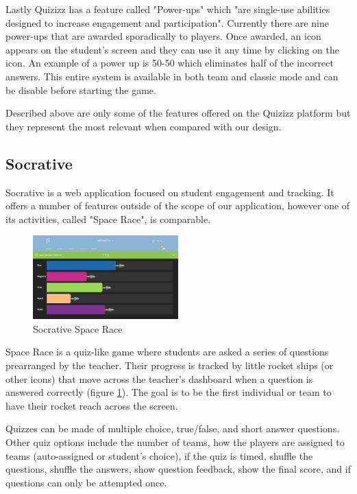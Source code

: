 \documentclass{article}
\begin{document}
Lastly Quizizz has a feature called "Power-ups" which "are single-use abilities designed to increase engagement and participation"\cite{quizizz}. Currently there are nine power-ups that are awarded sporadically to players. Once awarded, an icon appears on the student's screen and they can use it any time by clicking on the icon. An example of a power up is 50-50 which eliminates half of the incorrect answers. This entire system is available in both team and classic mode and can be disable before starting the game.

Described above are only some of the features offered on the Quizizz platform but they represent the most relevant when compared with our design.

\subsection{Socrative}
Socrative is a web application focused on student engagement and tracking. It offers a number of features outside of the scope of our application, however one of its activities, called "Space Race", is comparable.
\begin{figure}
    \centering
    \includegraphics[width=0.5\textwidth]{images/socrative-space_race.jpg}
    \caption{Socrative Space Race \cite{socrative}}
    \label{fig:socrative-space-race}
\end{figure}
Space Race is a quiz-like game where students are asked a series of questions prearranged by the teacher. Their progress is tracked by little rocket ships (or other icons) that move across the teacher's dashboard when a question is answered correctly (figure \ref{fig:socrative-space-race}). The goal is to be the first individual or team to have their rocket reach across the screen.

Quizzes can be made of multiple choice, true/false, and short answer questions. Other quiz options include the number of teams, how the players are assigned to teams (auto-assigned or student's choice), if the quiz is timed, shuffle the questions, shuffle the answers, show question feedback, show the final score, and if questions can only be attempted once.
\end{document}
